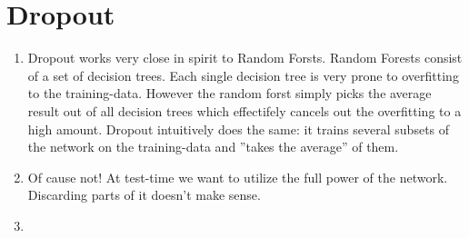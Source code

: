 \documentclass[12pt]{article}
\begin{document}
\section{Dropout}

\begin{enumerate}
    \item 
        Dropout works very close in spirit to Random Forsts. Random Forests consist of a set of decision trees. Each single decision tree is very prone to overfitting to the training-data. However the random forst simply picks the average result out of all decision trees which effectifely cancels out the overfitting to a high amount. Dropout intuitively does the same: it trains several subsets of the network on the training-data and ''takes the average'' of them. 
    \item
        Of cause not! At test-time we want to utilize the full power of the network. Discarding parts of it doesn't make sense.
    \item
\end{enumerate}
\end{document}
